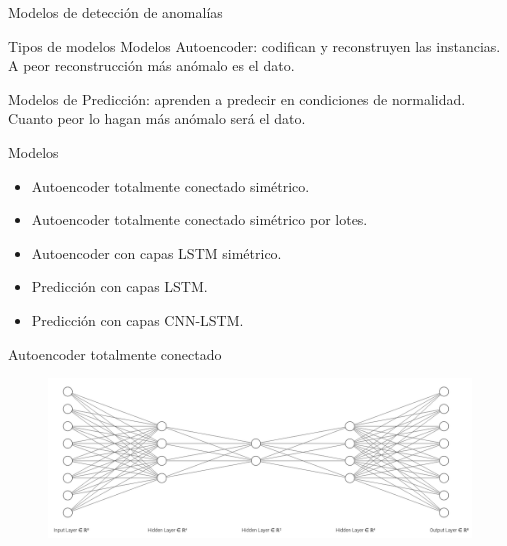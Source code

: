 \documentclass[10pt]{beamer}
\begin{document}
\begin{frame}[fragile]{Modelos de detección de anomalías}
	\vspace{10px}
	\pause
	
	\begin{block}{Tipos de modelos}
		Modelos Autoencoder: codifican y reconstruyen las instancias. A peor reconstrucción más anómalo es el dato.
		
		Modelos de Predicción: aprenden a predecir en condiciones de normalidad. Cuanto peor lo hagan más anómalo será el dato.
	\end{block}

	\pause
	
	\begin{block}{Modelos}
		\begin{itemize}
			\item Autoencoder totalmente conectado simétrico.
			\pause
			\item Autoencoder totalmente conectado simétrico por lotes.
			\pause
			\item Autoencoder con capas LSTM simétrico.
			\pause
			\item Predicción con capas LSTM.
			\pause
			\item Predicción con capas CNN-LSTM.
		\end{itemize}
	\end{block}
	
\end{frame}

\begin{frame}[fragile]{Autoencoder totalmente conectado}
	\vspace{10px}
	\pause
	
	\begin{figure}[H]
		\centering
		\includegraphics[scale=0.29]{Imagenes/autoencoder-fcc.png}
	\end{figure}
	
\end{frame}
\end{document}
